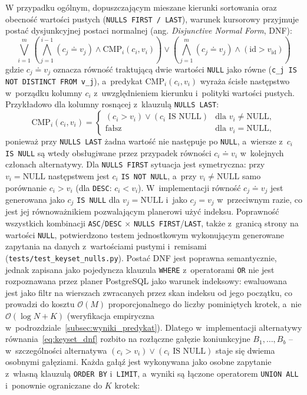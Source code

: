 W przypadku ogólnym, dopuszczającym mieszane kierunki sortowania oraz obecność wartości pustych (\texttt{NULLS FIRST / LAST}), warunek kursorowy przyjmuje postać dysjunkcyjnej postaci normalnej (ang. \emph{Disjunctive Normal Form}, DNF):
\begin{equation}
\bigvee_{i=1}^{m} \left( \bigwedge_{j=1}^{i-1} (c_j \doteq v_j) \land \text{CMP}_i(c_i, v_i) \right) \lor \left( \bigwedge_{j=1}^{m} (c_j \doteq v_j) \land (\text{id} > v_{\text{id}}) \right)
\label{eq:keyset_dnf}
\end{equation}
gdzie $c_j \doteq v_j$ oznacza równość traktującą dwie wartości \texttt{NULL} jako równe (\texttt{c\_j IS NOT DISTINCT FROM v\_j}), a~predykat $\text{CMP}_i(c_i, v_i)$ wyraża ścisłe następstwo w~porządku kolumny $c_i$ z~uwzględnieniem kierunku i~polityki wartości pustych. Przykładowo dla kolumny rosnącej z~klauzulą \texttt{NULLS LAST}:
\begin{equation}
\text{CMP}_i(c_i, v_i) = \begin{cases}
(c_i > v_i) \lor (c_i \text{ IS NULL}) & \text{dla } v_i \ne \text{NULL}, \\
\text{fałsz} & \text{dla } v_i = \text{NULL},
\end{cases}
\label{eq:keyset_nulls_last}
\end{equation}
ponieważ przy \texttt{NULLS LAST} żadna wartość nie następuje po \texttt{NULL}, a~wiersze z~$c_i$ \texttt{IS NULL} są wtedy obsługiwane przez przypadek równości $c_i \doteq v_i$ w~kolejnych członach alternatywy. Dla \texttt{NULLS FIRST} sytuacja jest symetryczna: przy $v_i = \text{NULL}$ następstwem jest $c_i$ \texttt{IS NOT NULL}, a~przy $v_i \ne \text{NULL}$ samo porównanie $c_i > v_i$ (dla \texttt{DESC}: $c_i < v_i$). W~implementacji równość $c_j \doteq v_j$ jest generowana jako $c_j$ \texttt{IS NULL} dla $v_j = \text{NULL}$ i~jako $c_j = v_j$ w~przeciwnym razie, co jest jej równoważnikiem pozwalającym planerowi użyć indeksu. Poprawność wszystkich kombinacji \texttt{ASC}/\texttt{DESC} $\times$ \texttt{NULLS FIRST}/\texttt{LAST}, także z~granicą strony na wartości \texttt{NULL}, potwierdzono testem jednostkowym wykonującym generowane zapytania na danych z~wartościami pustymi i~remisami (\texttt{tests/test\_keyset\_nulls.py}).
Postać DNF jest poprawna semantycznie, jednak zapisana jako pojedyncza klauzula \texttt{WHERE} z~operatorami \texttt{OR} nie jest rozpoznawana przez planer PostgreSQL jako warunek indeksowy: ewaluowana jest jako filtr na wierszach zwracanych przez skan indeksu od jego początku, co prowadzi do kosztu $\mathcal{O}(M)$ proporcjonalnego do liczby pominiętych krotek, a~nie $\mathcal{O}(\log N + K)$ (weryfikacja empiryczna w~podrozdziale~\ref{subsec:wyniki_predykat}). Dlatego w~implementacji alternatywy równania~\eqref{eq:keyset_dnf} rozbito na rozłączne gałęzie koniunkcyjne $B_1, \dots, B_b$ -- w~szczególności alternatywa $(c_i > v_i) \lor (c_i \text{ IS NULL})$ staje się dwiema osobnymi gałęziami. Każda gałąź jest wykonywana jako osobne zapytanie z~własną klauzulą \texttt{ORDER BY} i~\texttt{LIMIT}, a~wyniki są łączone operatorem \texttt{UNION ALL} i~ponownie ograniczane do $K$ krotek:
